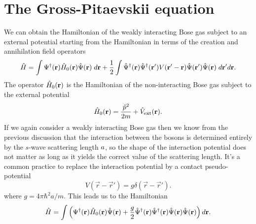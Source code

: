 \section{The Gross-Pitaevskii equation}

We can obtain the Hamiltonian of the weakly interacting Bose gas subject to an
external potential starting from the Hamiltonian in terms of the creation and
annihilation field operators
%
\begin{equation}
  \label{eq:hamiltonian-full-second-quant}
  {\hat{H}} = \int {\Psi}^\dagger(\mathbf r) {\hat{H}}_0(\mathbf r) {\hat{\Psi}}(\mathbf r) \; d\mathbf r +
  \frac{1}{2} \int {\hat{\Psi}}^\dagger(\mathbf r) {\hat{\Psi}}^\dagger(\mathbf r')  V(\mathbf r' - \mathbf r) {\hat{\Psi}}(\mathbf r') {\hat{\Psi}}(\mathbf r) \; d \mathbf r' d \mathbf r.
\end{equation}
%
The operator ${\hat{H}}_0(\mathbf r)$ is the Hamiltonian of the non-interacting
Bose gas subject to the external potential
%
\begin{equation}
  \label{eq:non-interacting-hamiltonian}
  {\hat{H}}_0(\mathbf r) = \frac{{\hat{p}}^2}{2m} + {\hat{V}}_\mathrm{ext}(\mathbf r).
\end{equation}
%
If we again consider a weakly interacting Bose gas then we know from the
previous discussion that the interaction between the bosons is determined
entirely by the $s$-wave scattering length $a$, so the shape of the
interaction potential does not matter as long as it yields the correct value of
the scattering length. It's a common practice to replace the interaction
potential by a contact pseudo-potential
%
\begin{equation}
  V(\vec r - \vec r') = g \delta(\vec r - \vec r').
\end{equation}
%
where $g = 4 \pi \hbar^2 a / m$. This leads us to the Hamiltonian
%
\begin{equation}
  \label{eq:pseudo-potential-hamiltonian}
  {\hat{H}} = \int \left({\Psi}^\dagger(\mathbf r) {\hat{H}}_0(\mathbf r) {\hat{\Psi}}(\mathbf r) +
  \frac{g}{2} {\hat{\Psi}}^\dagger(\mathbf r) {\hat{\Psi}}^\dagger(\mathbf r) {\hat{\Psi}}(\mathbf r) {\hat{\Psi}}(\mathbf r)\right)  d \mathbf r.
\end{equation}


